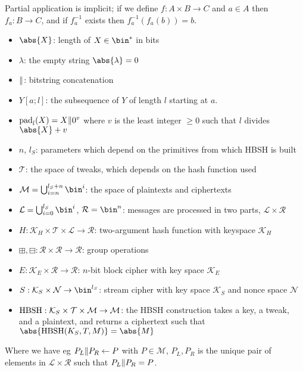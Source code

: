 \documentclass[eprint.tex]{subfiles}
\begin{document}
Partial application is implicit; if we define $f: A \times B \rightarrow C$ and
$a \in A$ then $f_a: B \rightarrow C$, and if $f_a^{-1}$ exists then $f_a^{-1}(f_a(b)) = b$.
\begin{itemize}
    \item $\abs{X}$: length of $X \in \bin^{*}$ in bits
    \item $\lambda$: the empty string $\abs{\lambda} = 0$
    \item $\Vert$: bitstring concatenation
    \item $Y[a;l]$: the subsequence of $Y$ of length $l$ starting at $a$.
    \item $\operatorname{pad}_l(X) = X \Vert 0^v$ where $v$ is the least integer $\geq 0$ such that $l$ divides $\abs{X} + v$
    \item $n$, $l_S$: parameters which depend on the
    primitives from which HBSH is built
    \item $\mathcal{T}$: the
    space of tweaks, which depends on the hash function used
    \item $\mathcal{M} = \bigcup_{i=n}^{l_S + n}\bin^i$: the
    space of plaintexts and ciphertexts
    \item $\mathcal{L} = \bigcup_{i=0}^{l_S}\bin^i$, $\mathcal{R} = \bin^n$: messages are processed in two parts,
    $\mathcal{L} \times \mathcal{R}$
    \item $H: \mathcal{K}_H \times \mathcal{T} \times \mathcal{L} \rightarrow \mathcal{R}$: two-argument hash function with keyspace $\mathcal{K}_H$
    \item $\boxplus, \boxminus: \mathcal{R} \times \mathcal{R} \rightarrow \mathcal{R}$: group operations
    \item $E: \mathcal{K}_E \times \mathcal{R} \rightarrow \mathcal{R}$: $n$-bit block cipher with key space $\mathcal{K}_E$
    \item $S: \mathcal{K}_S \times \mathcal{N} \rightarrow \bin^{l_S}$:
    stream cipher with key space $\mathcal{K}_S$
    and nonce space $\mathcal{N}$
    \item $\operatorname{HBSH} : \mathcal{K}_S \times \mathcal{T} \times \mathcal{M} \rightarrow \mathcal{M}$: the HBSH construction takes a key, a tweak, and
    a plaintext, and returns a ciphertext such that $\abs{\HBSH(K_S, T, M)} = \abs{M}$
\end{itemize}
Where we have eg $P_L \Vert P_R \gets P$
with $P \in \mathcal{M}$, $P_L, P_R$ is the unique
pair of elements in $\mathcal{L} \times \mathcal{R}$ such that
$P_L \Vert P_R = P$.
\end{document}
